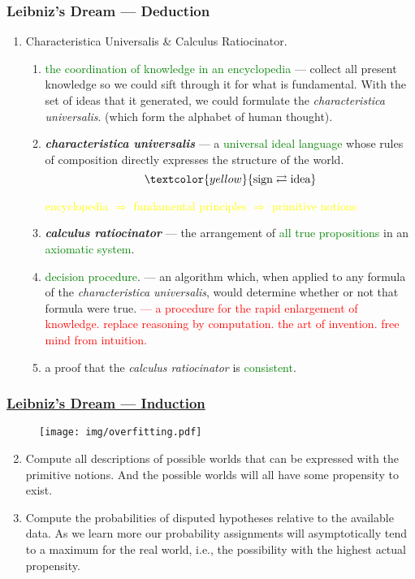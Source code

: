 \documentclass[UTF8,11pt,colorlinks,compress,openany]{beamer}%
\begin{document}
\begin{frame}\frametitle{Leibniz's Dream --- Deduction}
		\begin{enumerate}[1]
			\item Characteristica Universalis \& Calculus Ratiocinator.
			\begin{enumerate}[i]
				\item \textcolor{green}{the coordination of knowledge in an encyclopedia} --- collect all present knowledge so we could sift through it for what is fundamental. With the set of ideas that it generated, we could formulate the \emph{characteristica universalis}. (which form the alphabet of human thought).
				\item \emph{\textbf{characteristica universalis}} --- a \textcolor{green}{universal ideal language} whose rules of composition directly expresses the structure of the world.
					\[\textcolor{yellow}{\text{sign}\rightleftarrows\text{idea}}\]
					\begin{center}
						{\footnotesize \textcolor{yellow}{
								encyclopedia $\Rightarrow$ fundamental principles $\Rightarrow$ primitive notions}}
					\end{center}
				\item \emph{\textbf{calculus ratiocinator}} --- the arrangement of \textcolor{green}{all true propositions} in an \textcolor{green}{axiomatic system}.
				\item \textcolor{green}{decision procedure}. --- an algorithm which, when applied to any formula of the \emph{characteristica universalis}, would determine whether or not that formula were true. \textcolor{red}{--- a procedure for the rapid enlargement of knowledge. replace reasoning by computation. the art of invention. free mind from intuition.}
				\item a proof that the \emph{calculus ratiocinator} is \textcolor{green}{consistent}.
			\end{enumerate}
		\end{enumerate}
\end{frame}

\begin{frame}\frametitle{\href{https://philpapers.org/rec/HACTLP}{Leibniz's Dream --- Induction}}
		\begin{figure}
			\texttt{[image: img/overfitting.pdf]}
		\end{figure}
		\vspace{-7pt}
		\begin{enumerate}\setcounter{enumi}{1}
			\item Compute all descriptions of possible worlds that can be expressed with the primitive notions. And the possible worlds will all have some propensity to exist.
			\item Compute the probabilities of disputed hypotheses relative to the available data. As we learn more our probability assignments will asymptotically tend to a maximum for the real world, i.e., the possibility with the highest actual propensity.
		\end{enumerate}
\end{frame}
\end{document}
